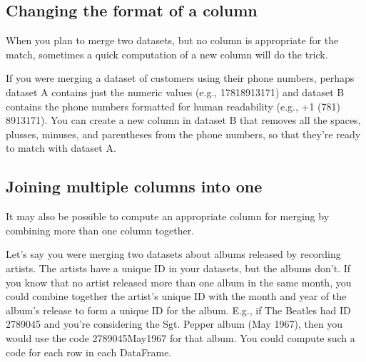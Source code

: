 \documentclass[letterpaper,10pt,english]{sphinxmanual}
\begin{document}
\begin{sphinxVerbatim}[commandchars=\\\{\}]
    
    \PYG{p}{[}\PYG{p}{]}
    \PYG{p}{[}\PYG{p}{]} 
\end{sphinxVerbatim}


\subsection{Changing the format of a column}
\label{\detokenize{chapter-12-concat-and-merge:changing-the-format-of-a-column}}
When you plan to merge two datasets, but no column is appropriate for the match, sometimes a quick computation of a new column will do the trick.

  If you were merging a dataset of customers using their phone numbers, perhaps dataset A contains just the numeric values (e.g., 17818913171) and dataset B contains the phone numbers formatted for human readability (e.g., +1 (781) 891\sphinxhyphen{}3171).  You can create a new column in dataset B that removes all the spaces, plusses, minuses, and parentheses from the phone numbers, so that they’re ready to match with dataset A.


\subsection{Joining multiple columns into one}
\label{\detokenize{chapter-12-concat-and-merge:joining-multiple-columns-into-one}}
It may also be possible to compute an appropriate column for merging by combining more than one column together.

  Let’s say you were merging two datasets about albums released by recording artists.  The artists have a unique ID in your datasets, but the albums don’t.  If you know that no artist released more than one album in the same month, you could combine together the artist’s unique ID with the month and year of the album’s release to form a unique ID for the album.  E.g., if The Beatles had ID 2789045 and you’re considering the Sgt. Pepper album (May 1967), then you would use the code 2789045\sphinxhyphen{}May\sphinxhyphen{}1967 for that album.  You could compute such a code for each row in each DataFrame.
\end{document}
